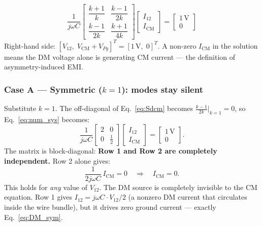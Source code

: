 \begin{eqnbox}
\begin{equation}
\frac{1}{j\omega C}
\begin{bmatrix}
    \dfrac{k+1}{k}  & \dfrac{k-1}{2k} \\[10pt]
    \dfrac{k-1}{2k} & \dfrac{k+1}{4k}
\end{bmatrix}
\begin{bmatrix} I_{12} \\[4pt] I_{\mathrm{CM}} \end{bmatrix}
=
\begin{bmatrix} 1\,\mathrm{V} \\[4pt] 0 \end{bmatrix}
\label{eq:num_sys}
\end{equation}
Right-hand side: $[V_{12},\;V_{\mathrm{CM}}+V_{Pg}]^T = [1\,\mathrm{V},\;0]^T$.
A non-zero $I_{\mathrm{CM}}$ in the solution means the DM voltage
alone is generating CM current — the definition of asymmetry-induced
EMI.
\end{eqnbox}

\subsubsection*{Case A — Symmetric ($k = 1$): modes stay silent}

Substitute $k = 1$.  The off-diagonal of Eq.~\eqref{eq:Sdcm}
becomes $\tfrac{k-1}{2k}\big|_{k=1} = 0$, so
Eq.~\eqref{eq:num_sys} becomes:
\[
\frac{1}{j\omega C}
\begin{bmatrix} 2 & 0 \\ 0 & \tfrac{1}{2} \end{bmatrix}
\begin{bmatrix} I_{12} \\ I_{\mathrm{CM}} \end{bmatrix}
=
\begin{bmatrix} 1\,\mathrm{V} \\ 0 \end{bmatrix}.
\]
The matrix is block-diagonal: \textbf{Row 1 and Row 2 are
completely independent.}  Row 2 alone gives:
\[
    \frac{1}{2j\omega C}\,I_{\mathrm{CM}} = 0
    \quad\Longrightarrow\quad
    \boxed{I_{\mathrm{CM}} = 0.}
\]
This holds for \emph{any} value of $V_{12}$.  The DM source is
completely invisible to the CM equation.  Row 1 gives
$I_{12} = j\omega C \cdot V_{12}/2$ (a nonzero DM current that
circulates inside the wire bundle), but it drives zero ground
current — exactly Eq.~\eqref{eq:DM_sym}.

